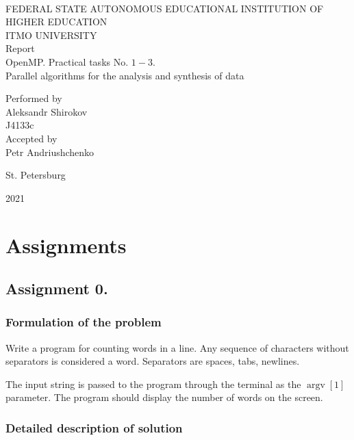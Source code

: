 \documentclass[%
12pt, %
final, %
oneside, %
onecolumn, %
centertags]{article} %
\theoremstyle{plain}
\theoremstyle{definition}
\theoremstyle{remark}
\begin{document}
	\begin{titlepage} 
		\begin{center}
		\textbf{}\\[2.0cm]
		\LARGE FEDERAL STATE AUTONOMOUS EDUCATIONAL INSTITUTION OF HIGHER EDUCATION \\[0.5cm]
		\Large ITMO UNIVERSITY \\[3cm]
		\LARGE Report\\
		\Large OpenMP. Practical tasks No. $1-3$. \\
		\Large Parallel algorithms for the analysis and synthesis of data \\[4cm]


		\begin{flushright}
		Performed by\\
		Aleksandr Shirokov\\
		J4133c\\
		Accepted by\\
		Petr Andriushchenko
		\end{flushright}

		\vfill 

		{\Large {St. Petersburg}} \par
		{\Large {2021}}
		\end{center} 
	\end{titlepage}

\tableofcontents
\newpage

\section{Assignments}

\subsection{Assignment 0.}

\subsubsection{Formulation of the problem}

Write a program for counting words in a line. Any sequence of characters without 
separators is considered a word. Separators are spaces, tabs, newlines.

The input string is passed to the program through the terminal as the $\operatorname{argv} [1]$ 
parameter. The program should display the number of words on the screen.

\subsubsection{Detailed description of solution}
\end{document}
